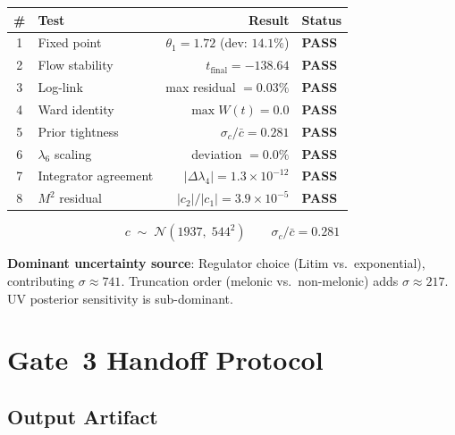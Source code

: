 \documentclass[11pt,a4paper]{article}
\theoremstyle{definition}
\theoremstyle{plain}
\theoremstyle{remark}
\begin{document}
\begin{center}
\renewcommand{\arraystretch}{1.3}
\begin{tabular}{clrl}
  \toprule
  \textbf{\#} & \textbf{Test} & \textbf{Result} & \textbf{Status} \\
  \midrule
  1 & Fixed point &
      $\theta_1=1.72$ \; (dev: $14.1\%$) & \textcolor{green!60!black}{\textbf{PASS}} \\
  2 & Flow stability &
      $t_{\text{final}}=-138.64$ & \textcolor{green!60!black}{\textbf{PASS}} \\
  3 & Log-link &
      max residual $=0.03\%$ & \textcolor{green!60!black}{\textbf{PASS}} \\
  4 & Ward identity &
      $\max W(t)=0.0$ & \textcolor{green!60!black}{\textbf{PASS}} \\
  5 & Prior tightness &
      $\sigma_c/\bar{c}=0.281$ & \textcolor{green!60!black}{\textbf{PASS}} \\
  6 & $\lambda_6$ scaling &
      deviation $=0.0\%$ & \textcolor{green!60!black}{\textbf{PASS}} \\
  7 & Integrator agreement &
      $|\Delta\lambda_4|=1.3\times10^{-12}$ & \textcolor{green!60!black}{\textbf{PASS}} \\
  8 & $M^2$ residual &
      $|c_2|/|c_1|=3.9\times10^{-5}$ & \textcolor{green!60!black}{\textbf{PASS}} \\
  \bottomrule
\end{tabular}
\end{center}

\bigskip
\begin{equation}
  \boxed{
    c \;\sim\; \mathcal{N}(1937,\;544^2)
    \qquad
    \sigma_c/\bar{c} = 0.281
  }
  \label{eq:result}
\end{equation}

\noindent
\textbf{Dominant uncertainty source}: Regulator choice (Litim vs.\
exponential), contributing $\sigma\approx741$.  Truncation order
(melonic vs.\ non-melonic) adds $\sigma\approx217$.  UV posterior
sensitivity is sub-dominant.


\section{Gate~3 Handoff Protocol}
\label{sec:handoff}

\subsection{Output Artifact}
\end{document}

